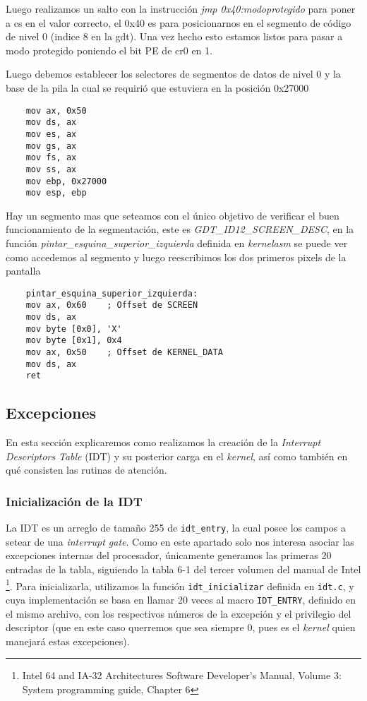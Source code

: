 Luego realizamos un salto con la instrucción \textit{jmp 0x40:modoprotegido} para poner a cs en el valor correcto, el 0x40 es para posicionarnos en el segmento de código de nivel 0 (indice 8 en la gdt). Una vez hecho esto estamos listos para pasar a modo protegido poniendo el bit PE de cr0 en 1. 

Luego debemos establecer los selectores de segmentos de datos de nivel 0 y la base de la pila la cual se requirió que estuviera en la posición 0x27000

\begin{lstlisting}
	mov ax, 0x50	
	mov ds, ax
	mov es, ax
	mov gs, ax
	mov fs, ax
	mov ss, ax
	mov ebp, 0x27000
	mov esp, ebp
\end{lstlisting}

Hay un segmento mas que seteamos con el único objetivo de verificar el buen funcionamiento de la segmentación, este es \textit{GDT\_ID12\_SCREEN\_DESC}, en la función \textit{pintar\_esquina\_superior\_izquierda} definida en \textit{kernelasm} se puede ver como accedemos al segmento y luego reescribimos los dos primeros pixels de la pantalla

\begin{lstlisting}
	pintar_esquina_superior_izquierda:
	mov ax, 0x60	; Offset de SCREEN
	mov ds, ax
	mov byte [0x0], 'X'
	mov byte [0x1], 0x4
	mov ax, 0x50	; Offset de KERNEL_DATA
	mov ds, ax
	ret	
\end{lstlisting}

\subsection{Excepciones}
\label{subsec:excepciones}
En esta sección explicaremos como realizamos la creación de la \textit{Interrupt Descriptors Table} (IDT) y su posterior carga en el \textit{kernel}, así como también en qué consisten las rutinas de atención.

\subsubsection{Inicialización de la IDT}
La IDT es un arreglo de tamaño 255 de \texttt{idt\_entry}, la cual posee los campos a setear de una \textit{interrupt gate}. Como en este apartado solo nos interesa asociar las excepciones internas del procesador, únicamente generamos las primeras 20 entradas de la tabla, siguiendo la tabla 6-1 del tercer volumen del manual de Intel \footnote{Intel 64 and IA-32 Architectures Software Developer's Manual, Volume 3: System programming guide, Chapter 6}. Para inicializarla, utilizamos la función \texttt{idt\_inicializar} definida en \texttt{idt.c}, y cuya implementación se basa en llamar 20 veces al macro \texttt{IDT\_ENTRY}, definido en el mismo archivo, con los respectivos números de la excepción y el privilegio del descriptor (que en este caso querremos que sea siempre 0, pues es el \textit{kernel} quien manejará estas excepciones).

